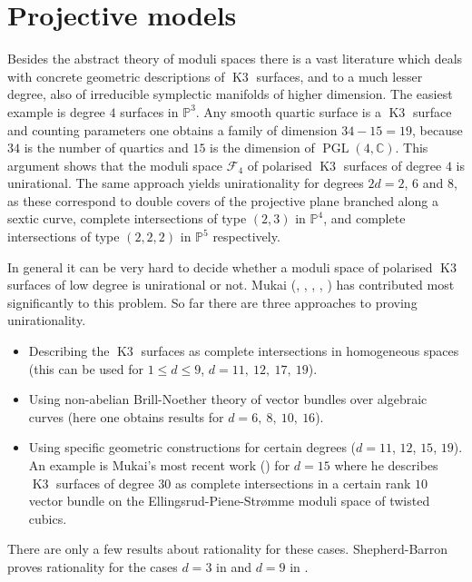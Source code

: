\documentclass[a4paper,11pt]{article}
\newcommand{\CC}{\mathbb C}
\newcommand{\PP}{\mathbb P}
\newcommand{\cF}{\mathcal F}
\newcommand{\PGL}{\mathop{\mathrm {PGL}}\nolimits}
\newcommand{\Kthree}{\mathop{\mathrm {K3}}\nolimits}
\begin{document}
\section{Projective models}\label{sect:projectivemodels}

Besides the abstract theory of moduli spaces there is a vast
literature which deals with concrete geometric descriptions of
$\Kthree$ surfaces, and to a much lesser degree, also of irreducible
symplectic manifolds of higher dimension. The easiest example is
degree $4$ surfaces in $\PP^3$. Any smooth quartic surface is a
$\Kthree$ surface and counting parameters one obtains a family of
dimension $34 - 15= 19$, because $34$ is the number of quartics and $15$
is the dimension of $\PGL(4,\CC)$. This argument shows that the moduli
space $\cF_4$ of polarised $\Kthree$ surfaces of degree $4$ is
unirational. The same approach yields unirationality for degrees
$2d=2$, $6$ and $8$, as these correspond to double covers of the projective
plane branched along a sextic curve, complete intersections of type
$(2,3)$ in $\PP^4$, and complete intersections of type $(2,2,2)$ in
$\PP^5$ respectively.

In general it can be very hard to decide whether a moduli space of
polarised $\Kthree$ surfaces of low degree is unirational or
not. Mukai (\cite{Mu1}, \cite{Mu2}, \cite{Mu3}, \cite{Mu4}, \cite{Mu5})
has contributed most significantly to this problem.  So far there are
three approaches to proving unirationality.
\begin{itemize}
\item[\rm{(1)}] Describing the $\Kthree$ surfaces as complete
  intersections in homogeneous spaces (this can be used for $1 \leq d
  \leq 9$, $d=11,\ 12,\ 17,\ 19$).
\item[\rm{(2)}] Using non-abelian Brill-Noether theory of vector
  bundles over algebraic curves (here one obtains results for
  $d=6,\ 8,\ 10,\ 16$).
\item[\rm{(3)}] Using specific geometric constructions for certain
  degrees ($d=11$, $12$, $15$, $19$). An example is Mukai's most recent
  work (\cite{Mu5}) for $d=15$ where he describes $\Kthree$ surfaces
  of degree $30$ as complete intersections in a certain rank $10$
  vector bundle on the Ellingsrud-Piene-Str{\o}mme moduli space of
  twisted cubics.
\end{itemize}

There are only a few results about rationality for these
cases. Shepherd-Barron proves rationality for the cases $d=3$ in
\cite{S-B2} and $d=9$ in \cite{S-B1}. 
\end{document}
